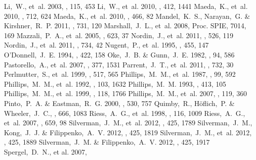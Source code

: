\documentclass[apj]{emulateapj-rtx4}
\begin{document}
\begin{thebibliography}{}
 Li,~W., et~al. 2003, \pasp, 115, 453
 Li,~W., et~al. 2010, \mnras, 412, 1441
 Maeda,~K., et~al. 2010, \apj,
  712, 624
 Maeda,~K., et~al. 2010, \nat,
  466, 82
 Mandel,~K.~S.,
  Narayan,~G. \& Kirshner,~R.~P. 2011, \apj, 731, 120
 Marshall,~J.~L.,
  et~al. 2008, Proc. SPIE, 7014, 169 
 Mazzali,~P.~A.,
  et~al. 2005, \apj, 623, 37
 Nordin,~J., et~al. 2011,
  \aap, 526, 119
 Nordin,~J., et~al. 2011,
  \apj, 734, 42
 Nugent,~P., et~al. 1995, \apjl,
  455, 147 
 O'Donnell,~J.~E. 1994, \apj,
  422, 158 
 Oke,~J.~B. \& Gunn,~J.~E. 1982, \pasp,
  94, 586
 Pastorello,~A.,
  et~al. 2007, \mnras, 377, 1531
 Parrent,~J.~T., et~al. 2011,
  \apj, 732, 30
 Perlmutter,~S.,
  et~al. 1999, \apj, 517, 565 
 Phillips,~M.~M.,
  et~al. 1987, \pasp, 99, 592
 Phillips,~M.~M.,
  et~al. 1992, \aj, 103, 1632  
 Phillips,~M.~M. 1993, \apjl, 413, 105 
  Phillips,~M.~M.,
  et~al. 1999, \aj, 118, 1766
 Phillips,~M.~M.,
  et~al. 2007, \pasp, 119, 360
 Pinto,~P.~A. \&
  Eastman,~R.~G. 2000, \apj, 530, 757
 Quimby,~R.,
  H\"oflich,~P. \& Wheeler,~J.~C., \apj, 666, 1083
 Riess,~A.~G., et~al. 1998, \aj,
  116, 1009
 Riess,~A.~G., et~al. 2007, \apj,
  659, 98
 Silverman,~J.~M.,
  et~al. 2012, \mnras, 425, 1789 
  Silverman,~J.~M., Kong,~J.~J. \& Filippenko,~A.~V. 2012, \mnras, 425, 1819
 Silverman,~J.~M.,
  et~al. 2012, \mnras, 425, 1889 
 Silverman,~J.~M. \&
  Filippenko,~A.~V. 2012, \mnras, 425, 1917
 Spergel,~D.~N., et al. 2007,

\end{thebibliography}
\end{document}
